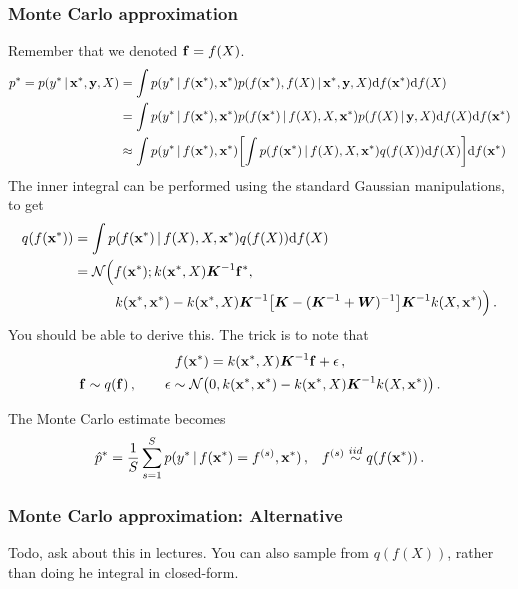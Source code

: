\documentclass[a4paper]{article}
\newcommand{\mat}[1]{{\boldsymbol{{#1}}}} %
\theoremstyle{definition}
\begin{document}
\subsubsection{Monte Carlo approximation}
Remember that we denoted $\mathbf{f} = f(X)$.
\begin{align}
p^* = p(y^*\given \vx^*, \vy, X) &= \int p(y^*\given f(\vx^*), \vx^*) p(f(\vx^*), f(X)\given \vx^*, \vy, X) \calcd{f(\vx^*)} \calcd{f(X)} \\
&=\int p(y^*\given f(\vx^*), \vx^*) p(f(\vx^*)\given f(X), X, \vx^*) p(f(X)\given \vy, X)  \calcd{f(X)} \calcd{f(\vx^*)} \\
&\approx \int p(y^*\given f(\vx^*), \vx^*) \left[\int p(f(\vx^*)\given f(X), X, \vx^*) q(f(X))  \calcd{f(X)} \right] \calcd{f(\vx^*)}
\end{align}
The inner integral can be performed using the standard Gaussian manipulations, to get
\begin{align}
q(f(\vx^*)) &= \int p(f(\vx^*)\given f(X), X, \vx^*) q(f(X))  \calcd{f(X)} \\
&= \mathcal N \Big(f(\vx^*); k(\vx^*, X)\mat K\inv\vf^*, \\
& \quad \qquad k(\vx^*,\vx^*) - k(\vx^*, X)\mat K\inv\left[\mat K - (\mat K\inv + \mat W)\inv\right]\mat K\inv k(X, \vx^*)\Big) \,.
\end{align}
You should be able to derive this. The trick is to note that
\begin{gather}
f(\vx^*) = k(\vx^*, X)\mat K\inv\vf + \epsilon \,, \\
\vf \sim q(\vf) \,, \qquad \epsilon \sim \NormDist{0, k(\vx^*, \vx^*) - k(\vx^*, X)\mat K\inv k(X, \vx^*)} \,.
\end{gather}

The Monte Carlo estimate becomes
\begin{align}
\hat p^* = \frac{1}{S}\sum_{s=1}^S p(y^*\,|\, f(\mathbf{x}^*) = f^{(s)}, \mathbf{x}^*) \,,  && f^{(s)} \overset{iid}{\sim} q(f(\mathbf{x}^*)) \,.
\end{align}


\subsubsection{Monte Carlo approximation: Alternative}
Todo, ask about this in lectures. You can also sample from $q(f(X))$, rather than doing he integral in closed-form.
\end{document}

